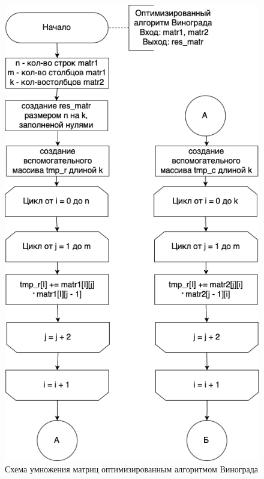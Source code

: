 \documentclass[a4paper,14pt, unknownkeysallowed]{extreport}
\begin{document}
\begin{figure}[h]
	\centering
	\includegraphics[scale=0.7]{img/optimized_winograd_alg_scheme1.png}
	\caption{Схема умножения матриц оптимизированным алгоритмом Винограда}
	\label{fig:optimized_winograd1}
\end{figure}

\clearpage
\end{document}
